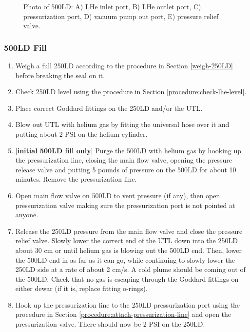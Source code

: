\begin{figure}[!htbp]
\begin{minipage}{.50\textwidth}
 \caption{Photo of 500LD: A) LHe inlet port, B) LHe outlet port, C) pressurization port, D) vacuum pump out port, E) pressure relief valve.}
 \label{fig:500LD-photo}
 \end{minipage}
 \end{figure}




\subsubsection{500LD Fill}
\label{practical-op:500LDfill}
\begin{enumerate}
 \item Weigh a full 250LD according to the procedure in Section \ref{weigh-250LD} before breaking the seal on it.
 \item Check 250LD level using the procedure in Section \ref{procedure:check-lhe-level}.
 \item Place correct Goddard fittings on the 250LD and/or the UTL.
 \item Blow out UTL with helium gas by fitting the universal hose over it and putting about 2 PSI on the helium cylinder.
 \item $[$\textbf{initial 500LD fill only}$]$ Purge the 500LD with helium gas by hooking up the pressurization line, closing the main flow valve, opening the pressure release valve and putting 5 pounds of pressure on the 500LD for about 10 minutes.  Remove the pressurization line.%
 \item Open main flow valve on 500LD to vent pressure (if any), then open pressurization valve making sure the pressurization port is not pointed at anyone.
 \item Release the 250LD pressure from the main flow valve and close the pressure relief valve.  Slowly lower the correct end of the UTL down into the 250LD about 30 cm or until helium gas is blowing out the 500LD end.  Then, lower the 500LD end in as far as it can go, while continuing to slowly lower the 250LD side at a rate of about 2 cm/s.  A cold plume should be coming out of the 500LD.  Check that no gas is escaping through the Goddard fittings on either dewar (if it is, replace fitting o-rings).
 \item Hook up the pressurization line to the 250LD pressurization port using the procedure in Section \ref{procedure:attach-pressurization-line} and open the pressurization valve.  There should now be 2 PSI on the 250LD.

\end{enumerate}
